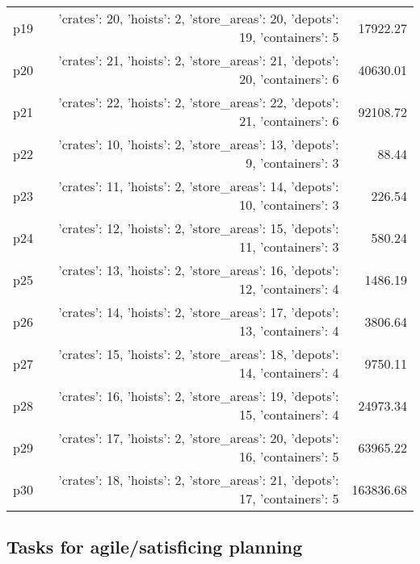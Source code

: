 \documentclass{article}
\begin{document}
\begin{center}
\begin{tabular}{@{}l|r|r@{}}
  p19&{'crates': 20, 'hoists': 2, 'store\_areas': 20, 'depots': 19, 'containers': 5}&17922.27\\
  p20&{'crates': 21, 'hoists': 2, 'store\_areas': 21, 'depots': 20, 'containers': 6}&40630.01\\
  p21&{'crates': 22, 'hoists': 2, 'store\_areas': 22, 'depots': 21, 'containers': 6}&92108.72\\
  p22&{'crates': 10, 'hoists': 2, 'store\_areas': 13, 'depots': 9, 'containers': 3}&88.44\\
  p23&{'crates': 11, 'hoists': 2, 'store\_areas': 14, 'depots': 10, 'containers': 3}&226.54\\
  p24&{'crates': 12, 'hoists': 2, 'store\_areas': 15, 'depots': 11, 'containers': 3}&580.24\\
  p25&{'crates': 13, 'hoists': 2, 'store\_areas': 16, 'depots': 12, 'containers': 4}&1486.19\\
  p26&{'crates': 14, 'hoists': 2, 'store\_areas': 17, 'depots': 13, 'containers': 4}&3806.64\\
  p27&{'crates': 15, 'hoists': 2, 'store\_areas': 18, 'depots': 14, 'containers': 4}&9750.11\\
  p28&{'crates': 16, 'hoists': 2, 'store\_areas': 19, 'depots': 15, 'containers': 4}&24973.34\\
  p29&{'crates': 17, 'hoists': 2, 'store\_areas': 20, 'depots': 16, 'containers': 5}&63965.22\\
  p30&{'crates': 18, 'hoists': 2, 'store\_areas': 21, 'depots': 17, 'containers': 5}&163836.68
                            \end{tabular}
                            \end{center}
                    

                                \subsection*{Tasks for agile/satisficing planning}
                                
\end{document}
